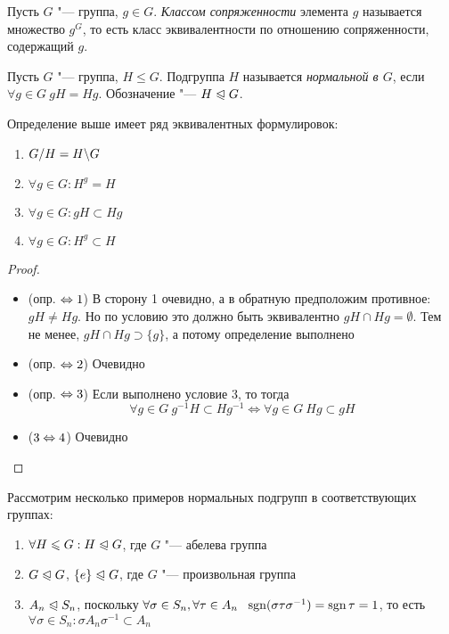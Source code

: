 \begin{definition}
	Пусть $G$ "--- группа, $g \in G$. \textit{Классом сопряженности} элемента $g$ называется множество $g^G$, то есть класс эквивалентности по отношению сопряженности, содержащий $g$.
\end{definition}

\begin{definition}
	Пусть $G$ "--- группа, $H \le G$. Подгруппа $H$ называется \textit{нормальной в $G$}, если $\forall g \in G\ gH = Hg$. Обозначение "--- $H \trianglelefteqslant G$.
\end{definition}

\begin{proposition}
	Определение выше имеет ряд эквивалентных формулировок:
	\begin{enumerate}
		\item $G / H = H \backslash G$
		
		\item $\forall g \in G: H^g = H$
		
		\item $\forall g \in G: gH \subset Hg$
		
		\item $\forall g \in G: H^g \subset H$
	\end{enumerate}
\end{proposition}

\begin{proof}~
	\begin{itemize}
		\item (опр. $\Leftrightarrow 1$) В сторону 1 очевидно, а в обратную предположим противное: $gH \neq Hg$. Но по условию это должно быть эквивалентно $gH \cap Hg = \emptyset$. Тем не менее, $gH \cap Hg \supset \{g\}$, а потому определение выполнено
		
		\item (опр. $\Leftrightarrow 2$) Очевидно
		
		\item (опр. $\Leftrightarrow 3$) Если выполнено условие 3, то тогда
		\[
		\forall g \in G\ g^{-1}H \subset Hg^{-1} \Longleftrightarrow \forall g \in G\ Hg \subset gH
		\]
		
		\item ($3 \Leftrightarrow 4$) Очевидно
	\end{itemize}
\end{proof}

\begin{example}
	Рассмотрим несколько примеров нормальных подгрупп в соответствующих группах:
	\begin{enumerate}
		\item $\forall H \leqslant G: H \trianglelefteqslant G$, где $G$ "--- абелева группа
		\item $G \trianglelefteqslant G$, $\{e\} \trianglelefteqslant G$, где $G$ "--- произвольная группа
		\item $A_n \trianglelefteqslant S_n$, поскольку $\forall \sigma \in S_n, \forall \tau \in A_n\ \ \sgn(\sigma\tau\sigma^{-1}) = \sgn\tau = 1$, то есть $\forall \sigma \in S_n: \sigma A_n\sigma^{-1} \subset A_n$
	\end{enumerate}
\end{example}


